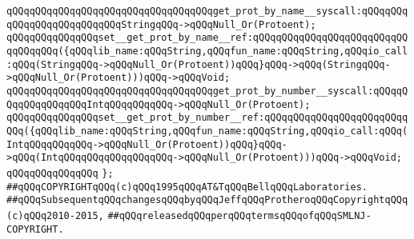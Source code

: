\verb|qQQqqQQqqQQqqQQqqQQqqQQqqQQqqQQqqQQqget_prot_by_name__syscall:qQQqqQQqqQQqqQQqqQQqqQQqqQQqStringqQQq->qQQqNull_Or(Protoent);|\newline
\verb|qQQqqQQqqQQqqQQqset__get_prot_by_name__ref:qQQqqQQqqQQqqQQqqQQqqQQqqQQqqQQqqQQq({qQQqlib_name:qQQqString,qQQqfun_name:qQQqString,qQQqio_call:qQQq(StringqQQq->qQQqNull_Or(Protoent))qQQq}qQQq->qQQq(StringqQQq->qQQqNull_Or(Protoent)))qQQq->qQQqVoid;|\newline
\newline
\verb|qQQqqQQqqQQqqQQqqQQqqQQqqQQqqQQqqQQqget_prot_by_number__syscall:qQQqqQQqqQQqqQQqqQQqIntqQQqqQQqqQQq->qQQqNull_Or(Protoent);|\newline
\verb|qQQqqQQqqQQqqQQqset__get_prot_by_number__ref:qQQqqQQqqQQqqQQqqQQqqQQqqQQq({qQQqlib_name:qQQqString,qQQqfun_name:qQQqString,qQQqio_call:qQQq(IntqQQqqQQqqQQq->qQQqNull_Or(Protoent))qQQq}qQQq->qQQq(IntqQQqqQQqqQQqqQQqqQQq->qQQqNull_Or(Protoent)))qQQq->qQQqVoid;|\newline
\verb|qQQqqQQqqQQqqQQq|\newline
\verb|};|\newline
\newline
\newline
\newline
\verb|##qQQqCOPYRIGHTqQQq(c)qQQq1995qQQqAT&TqQQqBellqQQqLaboratories.|\newline
\verb|##qQQqSubsequentqQQqchangesqQQqbyqQQqJeffqQQqProtheroqQQqCopyrightqQQq(c)qQQq2010-2015,|\newline
\verb|##qQQqreleasedqQQqperqQQqtermsqQQqofqQQqSMLNJ-COPYRIGHT.|\newline

